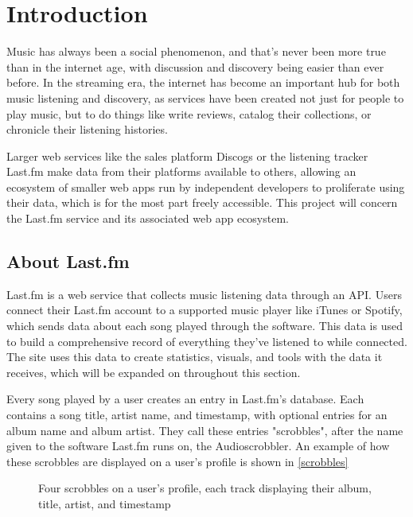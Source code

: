 \chapter{Introduction}\label{introduction}

Music has always been a social phenomenon, and that's never been more true than in the internet age, with discussion and discovery being easier than ever before. In the streaming era, the internet has become an important hub for both music listening and discovery, as services have been created not just for people to play music, but to do things like write reviews, catalog their collections, or chronicle their listening histories. 

Larger web services like the sales platform Discogs or the listening tracker Last.fm make data from their platforms available to others, allowing an ecosystem of smaller web apps run by independent developers to proliferate using their data, which is for the most part freely accessible. This project will concern the Last.fm service and its associated web app ecosystem.

\section{About Last.fm}

Last.fm is a web service that collects music listening data through an API. Users connect their Last.fm account to a supported music player like iTunes or Spotify, which sends data about each song played through the software. This data is used to build a comprehensive record of everything they've listened to while connected. The site uses this data to create statistics, visuals, and tools with the data it receives, which will be expanded on throughout this section.

Every song played by a user creates an entry in Last.fm's database. Each contains a song title, artist name, and timestamp, with optional entries for an album name and album artist. They call these entries "scrobbles", after the name given to the software Last.fm runs on, the Audioscrobbler. An example of how these scrobbles are displayed on a user's profile is shown in \autoref{scrobbles}

\begin{figure}[!ht]
	\begin{center}
		\caption{Four scrobbles on a user's profile, each track displaying their album, title, artist, and timestamp}\label{scrobbles}
	\end{center}
\end{figure}

